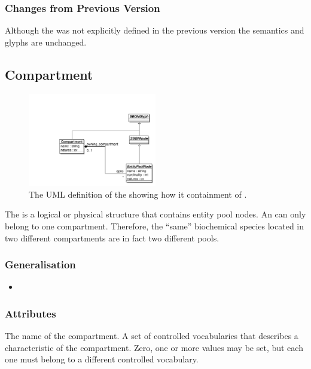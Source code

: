 \subsubsection{Changes from Previous Version}

Although the  was not explicitly defined in
the previous version the semantics and glyphs are unchanged.
 
\subsection{Compartment}
\label{defn:Compartment}

\begin{figure}[htb]
  \centering
  \includegraphics[width = 0.5\textwidth]{images/compartmentuml}
  \caption{The UML definition of the  showing
    how it containment of .}
  \label{fig:compartmentuml}
\end{figure}

The  is a logical or physical structure that
contains entity pool nodes. An  can only
belong to one compartment. Therefore, the ``same'' biochemical species
located in two different compartments are in fact two different pools.


\subsubsection{Generalisation}

\begin{itemize}
\item {}
\end{itemize}

\subsubsection{Attributes}

\begin{attributes}
   The name of the compartment.
   A set of controlled vocabularies that describes
  a characteristic of the compartment. Zero, one or more values may be
  set, but each one must belong to a different controlled vocabulary.
\end{attributes}

